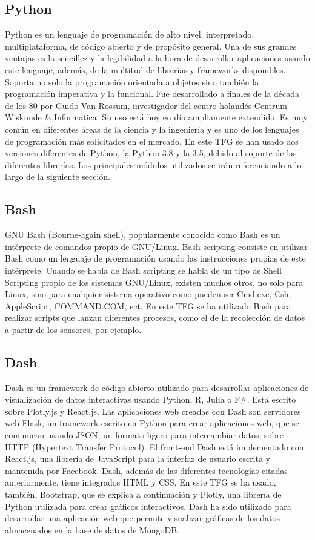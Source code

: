 \documentclass[a4paper, 12pt, oneside]{book}
\begin{document}
\subsection{Python}
\label{subsec:python}
Python es un lenguaje de programación de alto nivel, interpretado, multiplataforma, de código abierto y de propósito general. Una de sus grandes ventajas es la sencillez y la legibilidad a la hora de desarrollar aplicaciones usando este lenguaje, además, de la multitud de librerías y frameworks disponibles. Soporta no solo la programación orientada a objetos sino también la programación imperativa y la funcional.
Fue desarrollado a finales de la década de los 80 por Guido Van Rossum, investigador del centro holandés Centrum Wiskunde \& Informatica.
Su uso está hoy en día ampliamente extendido. Es muy común en diferentes áreas de la ciencia y la ingeniería y es uno de los lenguajes de programación más solicitados en el mercado.
En este TFG se han usado dos versiones diferentes de Python, la Python 3.8 y la 3.5, debido al soporte de las diferentes librerías.
Los principales módulos utilizados se irán referenciando a lo largo de la siguiente sección.

\subsection{Bash}
\label{subsec:bash}
GNU Bash (Bourne-again shell), popularmente conocido como Bash es un intérprete de comandos propio de GNU/Linux.
Bash scripting consiste en utilizar Bash como un lenguaje de programación usando las instrucciones propias de este intérprete. Cuando se habla de Bash scripting se habla de un tipo de Shell Scripting propio de los sistemas GNU/Linux, existen muchos otros, no solo para Linux, sino para cualquier sistema operativo como pueden ser Cmd.exe, Csh, AppleScript, COMMAND.COM, ect. En este TFG se ha utilizado Bash para realizar scripts que lanzan diferentes procesos, como el de la recolección de datos a partir de los sensores, por ejemplo.

\subsection{Dash}
\label{subsec:dash}

Dash es un framework de código abierto utilizado para desarrollar aplicaciones de visualización de datos interactivas usando Python, R, Julia o F\#. Está escrito sobre Plotly.js y React.js. Las aplicaciones web creadas con Dash son servidores web Flask, un framework escrito en Python para crear aplicaciones web, que se comunican usando JSON, un formato ligero para intercambiar datos, sobre HTTP (Hypertext Transfer Protocol).
El front-end Dash está implementado con React.js, una librería de JavaScript para la interfaz de usuario escrita y mantenida por Facebook. Dash, además de las diferentes tecnologías citadas anteriormente, tiene integrados HTML y CSS. En este TFG se ha usado, también, Bootstrap, que se explica a continuación y Plotly, una librería de Python utilizada para crear gráficos interactivos. Dash ha sido utilizado para desarrollar una aplicación web que permite visualizar gráficas de los datos almacenados en la base de datos de MongoDB.
\end{document}
